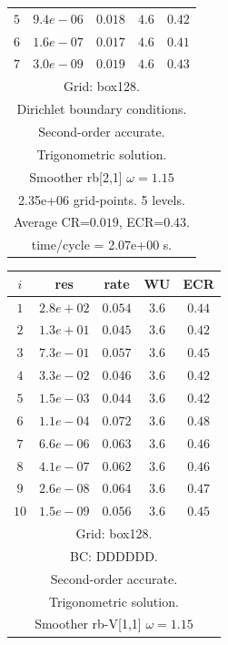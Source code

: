 \begin{table}[hbt]
\begin{center}
\begin{tabular}{|c|c|c|c|c|}
 $ 5$  & $ 9.4e-06$ & $0.018$ & $ 4.6$ & $0.42$ \\ 
 $ 6$  & $ 1.6e-07$ & $0.017$ & $ 4.6$ & $0.41$ \\ 
 $ 7$  & $ 3.0e-09$ & $0.019$ & $ 4.6$ & $0.43$ \\ 
\hline 
\multicolumn{5}{|c|}{Grid: box128.}  \\
\multicolumn{5}{|c|}{Dirichlet boundary conditions.}  \\
\multicolumn{5}{|c|}{Second-order accurate.}  \\
\multicolumn{5}{|c|}{Trigonometric solution.}  \\
\multicolumn{5}{|c|}{Smoother rb[2,1] $\omega=1.15$}  \\
\multicolumn{5}{|c|}{2.35e+06 grid-points. 5 levels.}  \\
\multicolumn{5}{|c|}{Average CR=$0.019$, ECR=$0.43$.}  \\
\multicolumn{5}{|c|}{time/cycle = 2.07e+00 s.}  \\
\hline 
\end{tabular}
\begin{tabular}{|c|c|c|c|c|} \hline 
 $i$   & res      & rate    &  WU    & ECR  \\   \hline 
 $ 1$  & $ 2.8e+02$ & $0.054$ & $ 3.6$ & $0.44$ \\ 
 $ 2$  & $ 1.3e+01$ & $0.045$ & $ 3.6$ & $0.42$ \\ 
 $ 3$  & $ 7.3e-01$ & $0.057$ & $ 3.6$ & $0.45$ \\ 
 $ 4$  & $ 3.3e-02$ & $0.046$ & $ 3.6$ & $0.42$ \\ 
 $ 5$  & $ 1.5e-03$ & $0.044$ & $ 3.6$ & $0.42$ \\ 
 $ 6$  & $ 1.1e-04$ & $0.072$ & $ 3.6$ & $0.48$ \\ 
 $ 7$  & $ 6.6e-06$ & $0.063$ & $ 3.6$ & $0.46$ \\ 
 $ 8$  & $ 4.1e-07$ & $0.062$ & $ 3.6$ & $0.46$ \\ 
 $ 9$  & $ 2.6e-08$ & $0.064$ & $ 3.6$ & $0.47$ \\ 
 $10$  & $ 1.5e-09$ & $0.056$ & $ 3.6$ & $0.45$ \\ 
\hline 
\multicolumn{5}{|c|}{Grid: box128.}  \\
\multicolumn{5}{|c|}{BC: DDDDDD.}  \\
\multicolumn{5}{|c|}{Second-order accurate.}  \\
\multicolumn{5}{|c|}{Trigonometric solution.}  \\
\multicolumn{5}{|c|}{Smoother rb-V[1,1] $\omega=1.15$}  \\

\end{tabular}
\end{center}
\end{table}

